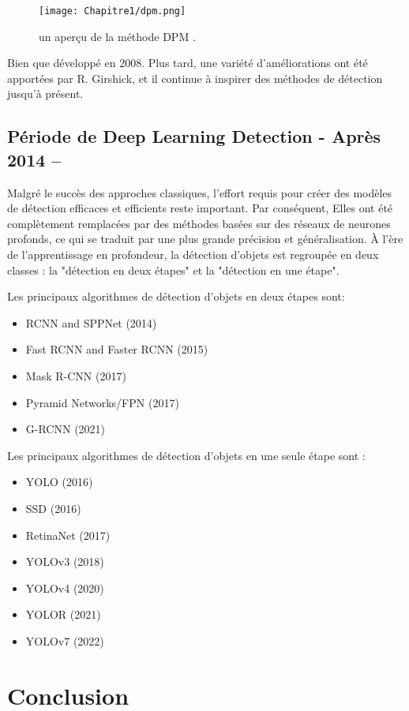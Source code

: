 \begin{figure}[H]
\centering
\texttt{[image: Chapitre1/dpm.png]}
\caption{un aperçu de la méthode DPM \cite{w1}.}
\label{dpm}
\end{figure}

Bien que développé en 2008. Plus tard, une variété d'améliorations ont été apportées par R. Girshick, et il continue à inspirer des méthodes de détection jusqu'à présent.

     
\subsection{Période de Deep Learning Detection - Après 2014 –} 
Malgré le succès des approches classiques, l'effort requis pour créer des modèles de détection efficaces et efficients reste important. Par conséquent, Elles ont été complètement remplacées par des méthodes basées sur des réseaux de neurones profonds, ce qui se traduit par une plus grande précision et généralisation. À l'ère de l'apprentissage en profondeur, la détection d'objets est regroupée en deux classes : la "détection en deux étapes" et la "détection en une étape".

Les principaux algorithmes de détection d'objets en deux étapes sont:

    \begin{itemize}
    \item RCNN and SPPNet (2014)
    \item Fast RCNN and Faster RCNN (2015)
    \item Mask R-CNN (2017)
    \item Pyramid Networks/FPN (2017)
    \item G-RCNN (2021)
    \end{itemize}
    
Les principaux algorithmes de détection d'objets en une seule étape sont :

    \begin{itemize}
    \item YOLO (2016)
    \item SSD (2016)
    \item RetinaNet (2017)
    \item YOLOv3 (2018)
    \item YOLOv4 (2020)
    \item YOLOR (2021)
    \item YOLOv7 (2022)
    \end{itemize}
     

\section{Conclusion}



